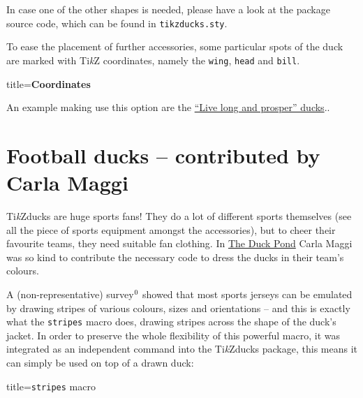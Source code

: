 \documentclass[parskip=half]{scrartcl}
\newcommand{\TikZ}{Ti\emph{k}Z\xspace}
\newcommand{\tikzducks}{Ti\emph{k}Zducks\xspace}
\begin{document}
In case one of the other shapes is needed, please have a look at the package source code, which can be found in \lstinline|tikzducks.sty|.

To ease the placement of further accessories, some particular spots of the duck are marked with \TikZ coordinates, namely the \lstinline|wing|, \lstinline|head| and \lstinline|bill|. 

{
\footnotesize\ttfamily
\begin{tcblisting}{title={\normalfont\normalsize\bfseries Coordinates}}
\end{tcblisting}
}
An example making use this option are the \hyperref[starducks]{``Live long and prosper'' ducks}.. 

\clearpage
\section{Football ducks -- contributed by Carla Maggi}
\label{sec:footballducks}

\tikzducks are huge sports fans! They do a lot of different sports themselves (see all the piece of sports equipment amongst the accessories), but to cheer their favourite teams, they need suitable fan clothing. In \href{https://tex.stackexchange.com/a/387126/36296}{The Duck Pond} Carla Maggi was so kind to contribute the necessary code to dress the ducks in their team's colours.

\addtocounter{footnote}{1}
A (non-representative) survey$^\thefootnote$ showed that most sports jerseys can be emulated by drawing stripes of various colours, sizes and orientations -- and this is exactly what the \lstinline|stripes| macro does, drawing stripes across the shape of the duck's jacket. In order to preserve the whole flexibility of this powerful macro, it was integrated as an independent command into the \tikzducks package, this means it can simply be used on top of a drawn duck:

\begin{tcblisting}{title={\texttt{stripes} macro}}
\begin{tikzpicture}
	\duck
	\stripes
\end{tikzpicture}
\end{tcblisting}
\end{document}
